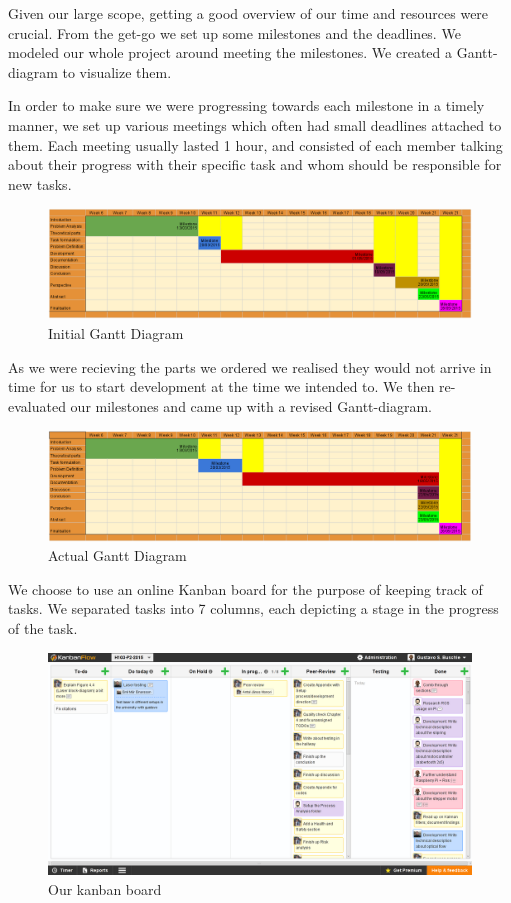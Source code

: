 Given our large scope, getting a good overview of our time and resources were crucial. From the get-go we set up some milestones and the deadlines. We modeled our whole project around meeting the milestones. We created a Gantt-diagram to visualize them.

In order to make sure we were progressing towards each milestone in a timely manner, we set up various meetings which often had small deadlines attached to them. Each meeting usually lasted 1 hour, and consisted of each member talking about their progress with their specific task and whom should be responsible for new tasks.

\begin{figure}[H]
	\centering
	\includegraphics[scale=.35]{images/gantt1.png}
	\caption{Initial Gantt Diagram}
\end{figure}

As we were recieving the parts we ordered we realised they would not arrive in time for us to start development at the time we intended to. We then re-evaluated our milestones and came up with a revised Gantt-diagram.

\begin{figure}[H]
	\centering
	\includegraphics[scale=.35]{images/gantt2.png}
	\caption{Actual Gantt Diagram}
\end{figure}

We choose to use an online Kanban board for the purpose of keeping track of tasks. We separated tasks into 7 columns, each depicting a stage in the progress of the task.

\begin{figure}[H]
	\centering
	\includegraphics[scale=.35]{images/kanban.png}
	\caption{Our kanban board}
\end{figure}

